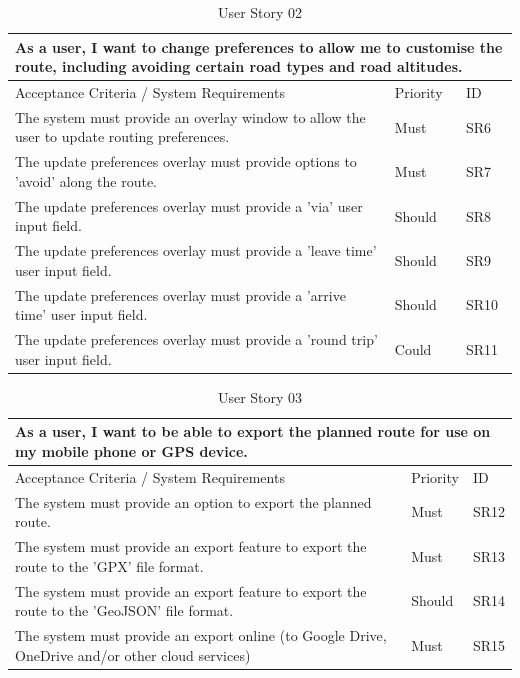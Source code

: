 \begin{table}[!htb]
\caption{User Story 02}
\label{tab:user-story-02}
\begin{tabular}{ p{11cm} p{1cm}  p{1cm} }
\hline
\multicolumn{3}{p{13cm}}{As a user, I want to change preferences to allow me to customise the route, including avoiding certain road types and road altitudes.}\\ 
\hline
Acceptance Criteria / System Requirements & Priority & ID\\
\hline
The system must provide an overlay window to allow the user to update routing preferences. & Must & SR6 \\
The update preferences overlay must provide options to 'avoid' along the route. & Must & SR7\\
The update preferences overlay must provide a 'via' user input field. & Should & SR8\\ 
The update preferences overlay must provide a 'leave time' user input field. & Should & SR9\\ 
The update preferences overlay must provide a 'arrive time' user input field. & Should & SR10\\ 
The update preferences overlay must provide a 'round trip' user input field. & Could & SR11\\ 
\hline
\end{tabular}
\end{table}

\begin{table}[!htb]
\caption{User Story 03}
\label{tab:user-story-03}
\begin{tabular}{ p{11cm} p{1cm}  p{1cm} }
\hline
\multicolumn{3}{p{13cm}}{As a user, I want to be able to export the planned route for use on my mobile phone or GPS device.}\\ 
\hline
Acceptance Criteria / System Requirements & Priority & ID\\
\hline
The system must provide an option to export the planned route. & Must & SR12 \\
The system must provide an export feature to export the route to the 'GPX' file format. & Must & SR13\\
The system must provide an export feature to export the route to the 'GeoJSON' file format. & Should & SR14\\ 
The system must provide an export online (to Google Drive, OneDrive and/or other cloud services) & Must & SR15\\
\hline
\end{tabular}
\end{table}

